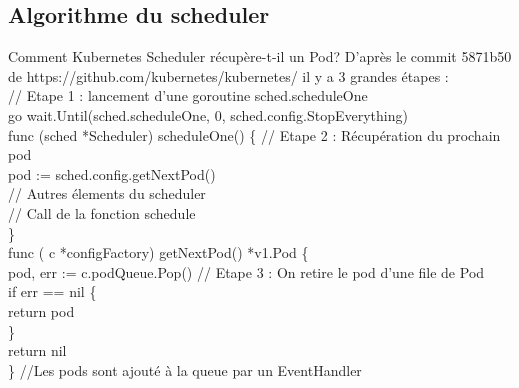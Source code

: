 \documentclass{bredelebeamer}
\begin{document}
\subsection{Algorithme du scheduler}
\begin{frame}{Comment Kubernetes Scheduler récupère-t-il un Pod?}
D'après le commit 5871b50 de https://github.com/kubernetes/kubernetes/ il y a 3 grandes étapes : 
\vspace{10px} \\

\textcolor{Framavert}{// Etape 1 : lancement d'une goroutine sched.scheduleOne\\}
\textcolor{Framarouge}{go} wait.\textcolor{Framableu}{Until}(sched.scheduleOne, \textcolor{Framableu}{0}, sched.config.StopEverything) \pause
\vspace{10px}\\
\textcolor{Framarouge}{func }\textcolor{Framaviolet}{(}\textcolor{Framaorange}{sched }\textcolor{Framaviolet}{*}\textcolor{Framaorange}{Scheduler}\textcolor{Framaviolet}{)} \textcolor{Framaviolet}{scheduleOne}() \{ \textcolor{Framavert}{// Etape 2  : Récupération du prochain pod} \\
\hspace{10px}	pod \textcolor{Framarouge}{:=} sched.config.\textcolor{Framableu}{getNextPod}() \\
\hspace{10px}    \textcolor{Framavert}{// Autres élements du scheduler}\\
\hspace{10px}    \textcolor{Framavert}{// Call de la fonction schedule}\\
\} \\ 
\pause
\vspace{10px} 
\textcolor{Framarouge}{func} \textcolor{Framaviolet}{(}
\textcolor{Framaorange}{c} \textcolor{Framaviolet}{*}\textcolor{Framaorange}{configFactory}\textcolor{Framaviolet}{) getNextPod()} *\textcolor{Framaorange}{v1.Pod} \{  \\
\hspace{10px}pod, err \textcolor{Framarouge}{:=} c.podQueue.\textcolor{Framableu}{Pop}() \textcolor{Framavert}{// Etape 3 : On retire le pod d'une file de Pod}\\
\hspace{10px}\textcolor{Framaorange}{if} err == \textcolor{Framableu}{nil} \{ \\
\hspace{10px}\hspace{10px}	return pod \\
\hspace{10px}	\} \\
\hspace{10px}	return  \textcolor{Framableu}{nil}\\
\} \pause
\textcolor{Framavert}{//Les pods sont ajouté à la queue par un EventHandler}

\end{frame}
\end{document}
